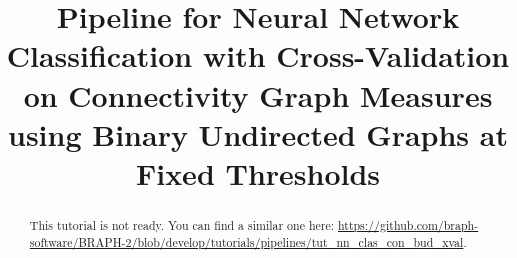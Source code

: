 \documentclass[justified]{tufte-handout}
\title[Classification Cross-Validation Connectivity BUT Measure]{Pipeline for Neural Network Classification with Cross-Validation on Connectivity Graph Measures using Binary Undirected Graphs at Fixed Thresholds}
\begin{document}
\maketitle

\begin{abstract}
\noindent
This tutorial is not ready. You can find a similar one here: \url{https://github.com/braph-software/BRAPH-2/blob/develop/tutorials/pipelines/tut_nn_clas_con_bud_xval}.
\end{abstract}
\end{document}
